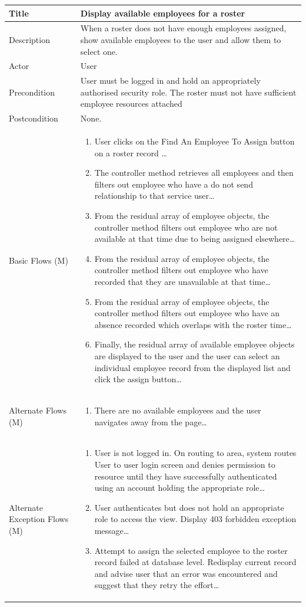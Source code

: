 \documentclass[a4paper,12pt]{article}
\newcommand\addrow[2]{#1 &#2\\ }
\newcommand\addheading[2]{#1 &#2\\ \hline}
\newcommand\tabularhead{\begin{tabular}{lp{8cm}}
\hline
}
\newcommand\addmulrow[2]{ \begin{minipage}[t][][t]{2.5cm}#1\end{minipage}%
   &\begin{minipage}[t][][t]{8cm}
    \begin{enumerate} #2   \end{enumerate}
    \end{minipage}\\ }
\newenvironment{usecase}{\tabularhead}
{\hline\end{tabular}}
\begin{document}
\begin{samepage}
\begin{usecase}
    \addheading{Title}{Display available employees for a roster}
  \addheading{Description}{When a roster does not have enough employees assigned, show available employees to the user and allow them to select one.}
  \addheading{Actor}{User} 
  \addrow{Precondition}{User must be logged in and hold an appropriately authorised security role. The roster must not have sufficient employee resources attached}
  \addrow{Postcondition}{None.}
  \addmulrow{Basic Flows (M)}{\item User clicks on the Find An Employee To Assign button on a roster record \ldots
  \newpage
  \item The controller method retrieves all employees and then filters out employee who have a do not send relationship to that service user\ldots
  \item From the residual array of employee objects, the controller method filters out employee who are not available at that time due to being assigned elsewhere\ldots
    \item From the residual array of employee objects, the controller method filters out employee who have recorded that they are unavailable at that time\ldots
        \item From the residual array of employee objects, the controller method filters out employee who have an absence recorded which overlaps with the roster time\ldots
            \item Finally, the residual array of available employee objects are displayed to the user and the user can select an individual employee record from the displayed list and click the assign button\ldots}
  \addmulrow{Alternate  Flows (M)}{\item There are no available employees and the user navigates away from the page\ldots}
  \addmulrow{Alternate Exception Flows (M)}{\item User is not logged in. On routing to area, system routes User to user login screen and denies permission to resource until they have successfully authenticated using an account holding the appropriate role\ldots
                                                                      \item User authenticates but does not hold an appropriate role to access the  view. Display 403 forbidden exception message\ldots
                                                                      \item Attempt to assign the selected employee to the roster record failed at database level. Redisplay current record and advise user that an error was encountered and suggest that they retry the effort\ldots}
\end{usecase}


\end{samepage}
\end{document}
